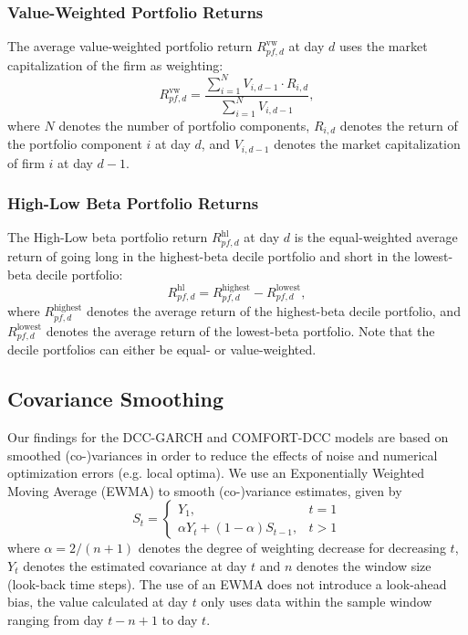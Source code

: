 \documentclass[11pt,a4paper]{article}
\begin{document}
\subsubsection{Value-Weighted Portfolio Returns}

The average value-weighted portfolio return $R_{\textit{pf},d}^{\textrm{vw}}$ at day $d$ uses the market capitalization of the firm as weighting:
\begin{equation}
    R_{\textit{pf},d}^{\textrm{vw}} = \dfrac{ \sum\limits_{i=1}^N V_{i,d-1} \cdot R_{i,d} }{ \sum\limits_{i=1}^N V_{i,d-1} },
\end{equation}
where $N$ denotes the number of portfolio components, $R_{i,d}$ denotes the return of the portfolio component $i$ at day $d$, and $V_{i,d-1}$ denotes the market capitalization of firm $i$ at day $d-1$.


\subsubsection{High-Low Beta Portfolio Returns}

The High-Low beta portfolio return $R_{pf,d}^{\textrm{hl}}$ at day $d$ is the equal-weighted average return of going long in the highest-beta decile portfolio and short in the lowest-beta decile portfolio:
\begin{equation}
    R_{pf,d}^{\textrm{hl}} = R_{\textit{pf},d}^{\textrm{highest}} - R_{\textit{pf},d}^{\textrm{lowest}},
\end{equation}
where $R_{\textit{pf},d}^{\textrm{highest}}$ denotes the average return of the highest-beta decile portfolio, and $R_{\textit{pf},d}^{\textrm{lowest}}$ denotes the average return of the lowest-beta portfolio. Note that the decile portfolios can either be equal- or value-weighted.





\subsection{Covariance Smoothing}

Our findings for the DCC-GARCH and COMFORT-DCC models are based on smoothed (co-)variances in order to reduce the effects of noise and numerical optimization errors (e.g. local optima). We use an Exponentially Weighted Moving Average (EWMA) to smooth (co-)variance estimates, given by
\begin{equation}
S_t = \begin{cases}
 Y_1,                                           & t = 1 \\
 \alpha Y_t + (1 - \alpha) S_{t-1}, & t > 1
\end{cases}
\end{equation}
where $\alpha = 2/(n+1)$ denotes the degree of weighting decrease for decreasing $t$, $Y_t$ denotes the estimated covariance at day $t$ and $n$ denotes the window size (look-back time steps). The use of an EWMA does not introduce a look-ahead bias, the value calculated at day $t$ only uses data within the sample window ranging from day $t - n + 1$ to day $t$.
\end{document}
